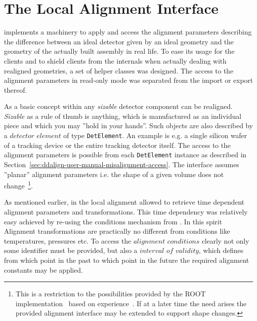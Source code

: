 \documentclass[10pt,a4paper]{article}
\begin{document}
\vspace{3cm}

\newpage
\section{The Local Alignment Interface}
\label{sec:ddalign-user-manual-ddalign-interface}

\noindent
\DDA implements a machinery to apply and access the alignment parameters
describing the difference between an ideal detector given by an ideal geometry
and the geometry of the actually built assembly in real life.
To ease its usage for the clients and to shield clients from the 
internals when actually dealing with realigned geometries, a set of 
helper classes was designed. The access to the alignment parameters 
in read-only mode was separated from the import or export thereof.

\noindent
As a basic concept within \DDhep any {\it{sizable}} detector component
can be realigned. {\it{Sizable}} as a rule of thumb is anything, which 
is manufactured as an individual piece and which you may ''hold in your hands''.
Such objects are also described by a $detector$ $element$ of type {\tt DetElement}.
An example is e.g. a single silicon wafer of a tracking device or the entire
tracking detector itself.
The access to the alignment parameters is possible from each {\tt DetElement}
instance as described in Section~\ref{sec:ddalign-user-manual-misalignment-access}.
The interface assumes ''planar'' alignment parameters i.e. the shape of 
a given volume does not change~\footnote{This is a restriction to the 
possibilities provided by the ROOT implementation~\cite{bib:ROOT-tgeo}
based on experience~\cite{bib:chris-parkes-priv-comm}.
If at a later time the need arises the provided alignment interface may 
be extended to support shape changes.}.

\noindent
As mentioned earlier, in the local alignment \DDA allowed to retrieve 
time dependent alignment parameters and transformations. This time
dependency was relatively easy achieved by re-using the conditions 
mechanism from \DDC. In this spirit Alignment transformations are 
practically no different from conditions like temperatures, pressures etc.
To access the $alignment$ $conditions$ clearly not only some 
identifier must be provided, but also a $interval$ $of$ $validity$,
which defines from which point in the past to which point in the future
the required alignment constants may be applied.
\end{document}
